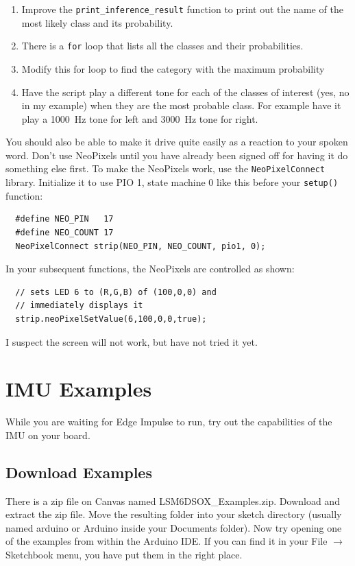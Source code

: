 \begin{enumerate}
  \item Improve the \lstinline|print_inference_result| function to print out the name 
          of the most likely class and its probability.
  \item There is a \lstinline|for| loop that lists all the classes and their probabilities.
  \item Modify this for loop to find the category with the maximum probability
  \item Have the script play a different tone for each of the classes of interest 
          (yes, no in my example) when they are the most probable class. For example
          have it play a 1000~Hz tone for left and 3000~Hz tone for right.
\end{enumerate}

You should also be able to make it drive quite easily as a reaction to your spoken word. 
Don't use NeoPixels until you have already been signed off for having it do something else first.
To make the NeoPixels work, use the \lstinline|NeoPixelConnect| library. Initialize it to use PIO 1, 
state machine 0 like this before your \lstinline|setup()| function:
\begin{lstlisting}
  #define NEO_PIN   17
  #define NEO_COUNT 17
  NeoPixelConnect strip(NEO_PIN, NEO_COUNT, pio1, 0);
\end{lstlisting}

In your subsequent functions, the NeoPixels are controlled as shown:
\begin{lstlisting}
  // sets LED 6 to (R,G,B) of (100,0,0) and 
  // immediately displays it
  strip.neoPixelSetValue(6,100,0,0,true);
\end{lstlisting}

I suspect the screen will not work, but have not tried it yet.

\section{IMU Examples \label{sec:IMUMLexamples}}
While you are waiting for Edge Impulse to run, try out the 
capabilities of the IMU on your board. 

\subsection{Download Examples}
There is a zip file on Canvas named LSM6DSOX\_Examples.zip. Download and extract the zip 
file. Move the resulting folder into your sketch directory (usually named arduino or Arduino 
inside your Documents folder). Now try opening one of the examples from within the Arduino IDE.
If you can find it in your File $\rightarrow$ Sketchbook menu, you have put them in the right
place.


